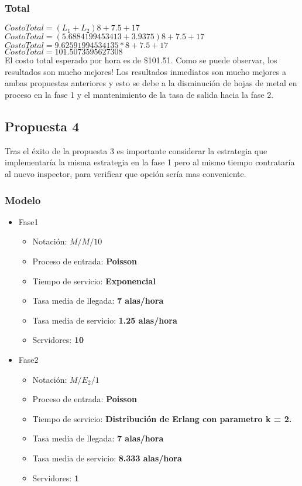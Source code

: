 \documentclass{article}
\begin{document}
\subsubsection{Total}
\noindent $CostoTotal = \left( L_{1} + L_{2} \right) 8 + 7.5 + 17$ \\
$CostoTotal = \left( 5.6884199453413 + 3.9375 \right) 8 + 7.5 + 17$ \\
$CostoTotal = 9.62591994534135*8 + 7.5 + 17$\\
$CostoTotal = 101.5073595627308$\\
El costo total esperado por hora es de \$101.51. Como se puede observar, 
los resultados son mucho mejores! Los resultados inmediatos
son mucho mejores a ambas propuestas anteriores y esto se debe a la disminución 
de hojas de metal en proceso en la fase 1 y el mantenimiento de la tasa de salida
hacia la fase 2.
\subsection{Propuesta 4}
Tras el éxito de la propuesta 3 es importante considerar la estrategia que 
implementaría la misma estrategia en la fase 1 pero al mismo tiempo contrataría 
al nuevo inspector, para verificar que opción sería mas conveniente.
\subsubsection{Modelo}
\begin{itemize}
	\item Fase1
		\begin{itemize}
			\item \large{Notación: } \textbf{$M/M/10$}
			\item \large{Proceso de entrada: } \textbf{Poisson}
			\item \large{Tiempo de servicio: } \textbf{Exponencial}
			\item \large{Tasa media de llegada: } \textbf{7 alas/hora}
			\item \large{Tasa media de servicio: } \textbf{1.25 alas/hora}
			\item \large{Servidores: } \textbf{10}
		\end{itemize}
	\item Fase2
		\begin{itemize}
			\item \large{Notación: } \textbf{$M/E_{2}/1$}
			\item \large{Proceso de entrada: } \textbf{Poisson}
			\item \large{Tiempo de servicio: } \textbf{Distribución de 
				Erlang con parametro k = 2.}
			\item \large{Tasa media de llegada: } \textbf{7 alas/hora}
			\item \large{Tasa media de servicio: } \textbf{8.333 alas/hora}
			\item \large{Servidores: } \textbf{1}
		\end{itemize}
\end{itemize}
\end{document}
